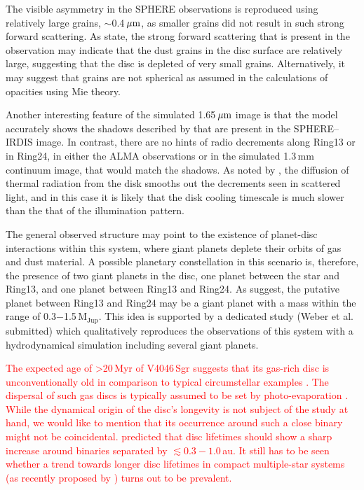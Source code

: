 \documentclass[fleqn,usenatbib,useAMS]{mnras}
\newcommand{\red}[1]{\textcolor{red}{#1}}
\begin{document}
The visible asymmetry in the SPHERE observations is reproduced using relatively large grains, $\sim$0.4\,$\hbox{$\mu$m}$, as smaller grains did not result in such strong forward scattering. As \citet{refId0} state, the strong forward scattering that is present in the observation may indicate that the dust grains in the disc surface are relatively large, suggesting that the disc is depleted of very small grains. Alternatively, it may suggest that grains are not spherical as assumed in the calculations of opacities using Mie theory. 

Another interesting feature of the simulated 1.65\,$\hbox{$\mu$m}$ image is that the model accurately shows the shadows described by \citet{dOrazi} that are present in the SPHERE–IRDIS image. In contrast, there are no hints of radio decrements along Ring13 or in Ring24, in either the ALMA observations or in the simulated 1.3\,mm continuum image, that would match the shadows. As noted by \citet{Casassus2019MNRAS.486L..58C}, the diffusion of thermal radiation from the disk smooths out the decrements seen in scattered light, and in this case it is likely that the disk cooling timescale is much slower than the that of the illumination pattern.

The general observed structure may point to the existence of planet-disc interactions within this system, where giant planets deplete their orbits of gas and dust material. A possible planetary constellation in this scenario is, therefore, the presence of two giant planets in the disc, one planet between the star and Ring13, and one planet between Ring13 and Ring24. As \citet{Ru_z_Rodr_guez_2019} suggest, the putative planet between Ring13 and Ring24 may be a giant planet with a mass within the range of 0.3$-$1.5\,$\mathrm{M}_{\mathrm{Jup}}$. This idea is supported by a dedicated study (Weber et al. submitted) which qualitatively reproduces the observations of this system with a hydrodynamical simulation including several giant planets.

\red{The expected age of >20\,Myr of V4046\,Sgr suggests that its gas-rich disc is unconventionally old in comparison to typical circumstellar examples \citep[e.g.][]{Fedele2010, Williams2011}. The dispersal of such gas discs is typically assumed to be set by photo-evaporation \citep{Alexander2006,Gorti2009}. While the dynamical origin of the disc's longevity is not subject of the study at hand, we would like to mention that its occurrence around such a close binary might not be coincidental. \citet{Alexander2012} predicted that disc lifetimes should show a sharp increase around binaries separated by $\lesssim 0.3-1.0\,$au. It still has to be seen whether a trend towards longer disc lifetimes in compact multiple-star systems (as recently proposed by \citealp{Ronco2021}) turns out to be prevalent.}
\end{document}
